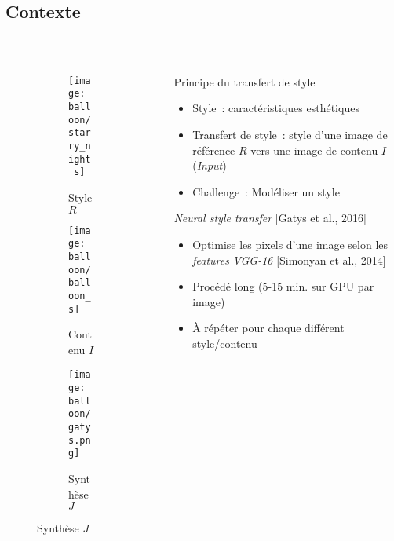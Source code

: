 \documentclass[aspectratio=169, 22pt]{beamer}
\begin{document}
\subsection{Contexte}
\begin{frame}{\secname~- \subsecname}
  \begin{columns}
    \begin{column}{0.4\linewidth}
      \begin{figure}
        \centering
        \begin{subfigure}{0.45\linewidth}\centering
          \texttt{[image: balloon/starry\_night\_s]}
          \caption{Style $R$}
        \end{subfigure}
        \begin{subfigure}{0.45\linewidth}\centering        
          \texttt{[image: balloon/balloon\_s]}
          \caption{Contenu $I$}
        \end{subfigure}

        \begin{subfigure}{0.8\linewidth}\centering
          \texttt{[image: balloon/gatys.png]}
          \caption{Synthèse $J$}
        \end{subfigure}
      \end{figure}
    \end{column}
    \begin{column}{0.6\linewidth}
      \begin{customblock}{Principe du transfert de style}
        \begin{itemize}
        \item \small Style : \alert{caractéristiques esthétiques}
        \item \small Transfert de style : style d'une
          image de \alert{référence} $R$ vers une image de \alert{contenu} $I$ (\emph{Input})
        \item \small Challenge : Modéliser un style
        \end{itemize}    
      \end{customblock}
      \begin{block}{\emph{Neural style transfer} [Gatys et al., 2016]}
        \begin{itemize}
        \item \small Optimise les pixels d'une image selon les
          \emph{features} \emph{VGG-16} [Simonyan et al., 2014]
        \item \small Procédé \alert{long} (5-15 min. sur GPU par image)
        \item \small À répéter pour chaque différent style/contenu
        \end{itemize}
      \end{block}
    \end{column}
  \end{columns}
\end{frame}
\end{document}
